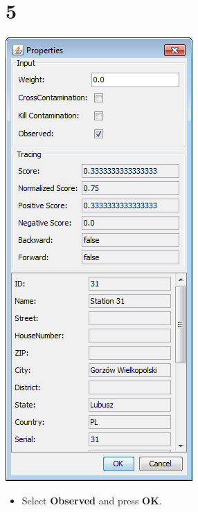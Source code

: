 \documentclass{beamer}
\begin{document}
\section{5}
\begin{frame}
	\begin{center}
  		\includegraphics[height=0.6\textheight]{5.png}
	\end{center}
	\begin{itemize}
		\item Select \textbf{Observed} and press \textbf{OK}.
	\end{itemize}
\end{frame}
\end{document}
